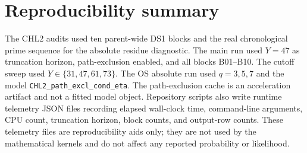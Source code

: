 \documentclass[10pt]{article}
\begin{document}
\section{Reproducibility summary}
The CHL2 audits used ten parent-wide DS1 blocks and the real chronological prime sequence for the absolute residue diagnostic. The main run used $Y=47$ as truncation horizon, path-exclusion enabled, and all blocks B01--B10. The cutoff sweep used $Y\in\{31,47,61,73\}$. The OS absolute run used $q=3,5,7$ and the model \texttt{CHL2\_path\_excl\_cond\_eta}. The path-exclusion cache is an acceleration artifact and not a fitted model object. Repository scripts also write runtime telemetry JSON files recording elapsed wall-clock time, command-line arguments, CPU count, truncation horizon, block counts, and output-row counts. These telemetry files are reproducibility aids only; they are not used by the mathematical kernels and do not affect any reported probability or likelihood.
\end{document}
